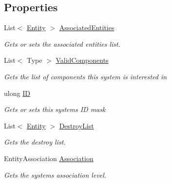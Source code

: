 \subsection*{Properties}
\begin{DoxyCompactItemize}
\item 
List$<$ \hyperlink{class_m_b2_d_1_1_entity_component_1_1_entity}{Entity} $>$ \hyperlink{class_m_b2_d_1_1_entity_component_1_1_entity_system_a1c442059af272594b0485832c9f44e94}{Associated\+Entities}
\begin{DoxyCompactList}\small\item\em Gets or sets the associated entities list. \end{DoxyCompactList}\item 
List$<$ Type $>$ \hyperlink{class_m_b2_d_1_1_entity_component_1_1_entity_system_ad78a75cc9b9bd5a4250ea725dbde3300}{Valid\+Components}
\begin{DoxyCompactList}\small\item\em Gets the list of components this system is interested in \end{DoxyCompactList}\item 
ulong \hyperlink{class_m_b2_d_1_1_entity_component_1_1_entity_system_a33c31c8fda2901b2bebd71caf39c0d23}{ID}
\begin{DoxyCompactList}\small\item\em Gets or sets this systems ID mask \end{DoxyCompactList}\item 
List$<$ \hyperlink{class_m_b2_d_1_1_entity_component_1_1_entity}{Entity} $>$ \hyperlink{class_m_b2_d_1_1_entity_component_1_1_entity_system_a9da3b207e098aa5fcc6ceb2aa3d247d8}{Destroy\+List}
\begin{DoxyCompactList}\small\item\em Gets the destroy list. \end{DoxyCompactList}\item 
Entity\+Association \hyperlink{class_m_b2_d_1_1_entity_component_1_1_entity_system_af68858392489a7aab3c91122ab48865f}{Association}
\begin{DoxyCompactList}\small\item\em Gets the systems association level. \end{DoxyCompactList}\end{DoxyCompactItemize}


